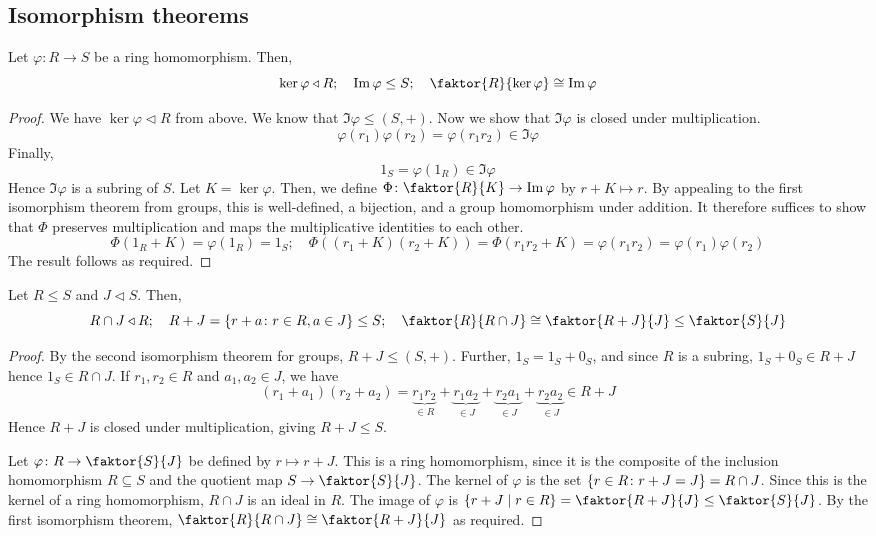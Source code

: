 \subsection{Isomorphism theorems}
\begin{theorem}
	Let \( \varphi \colon R \to S \) be a ring homomorphism.
	Then,
	\[ \ker \varphi \triangleleft R;\quad \Im \varphi \leq S;\quad \faktor{R}{\ker \varphi} \cong \Im \varphi \]
\end{theorem}
\begin{proof}
	We have \( \ker \varphi \triangleleft R \) from above.
	We know that \( \Im \varphi \leq (S, +) \).
	Now we show that \( \Im \varphi \) is closed under multiplication.
	\[ \varphi(r_1) \varphi(r_2) = \varphi(r_1 r_2) \in \Im \varphi \]
	Finally,
	\[ 1_S = \varphi(1_R) \in \Im \varphi \]
	Hence \( \Im \varphi \) is a subring of \( S \).
	Let \( K = \ker \varphi \).
	Then, we define \( \Phi \colon \faktor{R}{K} \to \Im \varphi \) by \( r+K \mapsto r \).
	By appealing to the first isomorphism theorem from groups, this is well-defined, a bijection, and a group homomorphism under addition.
	It therefore suffices to show that \( \Phi \) preserves multiplication and maps the multiplicative identities to each other.
	\[ \Phi(1_R + K) = \varphi(1_R) = 1_S;\quad \Phi((r_1+K)(r_2+K)) = \Phi(r_1 r_2 +K) = \varphi(r_1 r_2) = \varphi(r_1) \varphi(r_2) \]
	The result follows as required.
\end{proof}
\begin{theorem}
	Let \( R \leq S \) and \( J \triangleleft S \).
	Then,
	\[ R \cap J \triangleleft R;\quad R + J = \qty{r+a \colon r\in R, a \in J} \leq S;\quad \faktor{R}{R \cap J} \cong \faktor{R+J}{J} \leq \faktor{S}{J} \]
\end{theorem}
\begin{proof}
	By the second isomorphism theorem for groups, \( R+J \leq (S, +) \).
	Further, \( 1_S = 1_S + 0_S \), and since \( R \) is a subring, \( 1_S + 0_S \in R + J \) hence \( 1_S \in R \cap J \).
	If \( r_1, r_2 \in R \) and \( a_1, a_2 \in J \), we have
	\[ (r_1 + a_1)(r_2 + a_2) = \underbrace{r_1 r_2}_{\in R} + \underbrace{r_1 a_2}_{\in J} + \underbrace{r_2 a_1}_{\in J} + \underbrace{r_2 a_2}_{\in J} \in R + J \]
	Hence \( R+J \) is closed under multiplication, giving \( R+J \leq S \).

	Let \( \varphi \colon R \to \faktor{S}{J} \) be defined by \( r \mapsto r + J \).
	This is a ring homomorphism, since it is the composite of the inclusion homomorphism \( R \subseteq S \) and the quotient map \( S \to \faktor{S}{J} \).
	The kernel of \( \varphi \) is the set \( \qty{r \in R \colon r+J = J} = R \cap J \).
	Since this is the kernel of a ring homomorphism, \( R \cap J \) is an ideal in \( R \).
	The image of \( \varphi \) is \( \qty{r+J \mid r \in R} = \faktor{R+J}{J} \leq \faktor{S}{J} \).
	By the first isomorphism theorem, \( \faktor{R}{R \cap J} \cong \faktor{R+J}{J} \) as required.
\end{proof}

